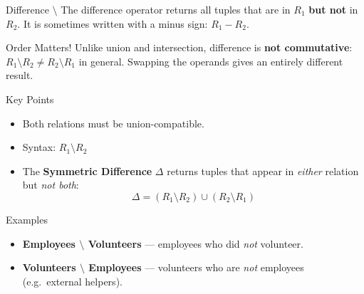 \begin{frame}{Difference $\setminus$}
  The difference operator returns all tuples that are in $R_1$
  \textbf{but not} in $R_2$.  It is sometimes written with a minus sign:
  $R_1 - R_2$.

  \begin{alertblock}{Order Matters!}
    Unlike union and intersection, difference is \textbf{not commutative}:
    $R_1 \setminus R_2 \neq R_2 \setminus R_1$ in general.  Swapping the
    operands gives an entirely different result.
  \end{alertblock}

  \begin{block}{Key Points}
    \begin{itemize}
      \item Both relations must be union-compatible.
      \item Syntax: $R_1 \setminus R_2$
      \item The \textbf{Symmetric Difference} $\Delta$ returns tuples that
            appear in \emph{either} relation but \emph{not both}:
            \[
              \Delta = (R_1 \setminus R_2) \cup (R_2 \setminus R_1)
            \]
    \end{itemize}
  \end{block}

  \begin{examples}{Examples}
    \begin{itemize}
      \item \textbf{Employees $\setminus$ Volunteers} — employees who did
            \emph{not} volunteer.
      \item \textbf{Volunteers $\setminus$ Employees} — volunteers who are
            \emph{not} employees (e.g.\ external helpers).
    \end{itemize}
  \end{examples}
\end{frame}

